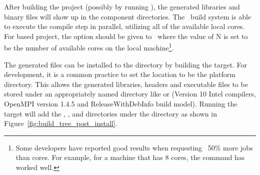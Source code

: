 After building the project (possibly by running \make), the generated libraries and binary files will show up in the component directories.  The \draco\ build system is able to execute the compile step in parallel, utilizing all of the available local cores.  For  based project, the option  should be given to \make\ where the value of N is set to be the number of available cores on the local machine\footnote{Some developers have reported good results when requesting ~50\% more jobs than cores.  For example, for a machine that has 8 cores, the command  has worked well.}.  

The generated files can be installed to the  directory by building the  target.  For development, it is a common practice to set the  location to be the platform  directory.   This allows the generated libraries, headers and executable files to be stored under an appropriately named directory like  or  (Version 10 Intel compilers, OpenMPI version 1.4.5 and ReleaseWithDebInfo build model).  Running the  target will add the , ,  and  directories under the   directory as shown in Figure~\ref{fig:build_tree_post_install}.
